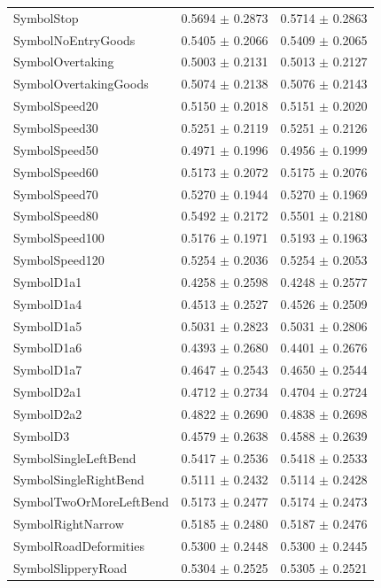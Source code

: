 \begin{longtable}{@{}lrr@{}}
SymbolStop & 0.5694 $\pm$ 0.2873 & 0.5714 $\pm$ 0.2863 \\
SymbolNoEntryGoods & 0.5405 $\pm$ 0.2066 & 0.5409 $\pm$ 0.2065 \\
SymbolOvertaking & 0.5003 $\pm$ 0.2131 & 0.5013 $\pm$ 0.2127 \\
SymbolOvertakingGoods & 0.5074 $\pm$ 0.2138 & 0.5076 $\pm$ 0.2143 \\
SymbolSpeed20 & 0.5150 $\pm$ 0.2018 & 0.5151 $\pm$ 0.2020 \\
SymbolSpeed30 & 0.5251 $\pm$ 0.2119 & 0.5251 $\pm$ 0.2126 \\
SymbolSpeed50 & 0.4971 $\pm$ 0.1996 & 0.4956 $\pm$ 0.1999 \\
SymbolSpeed60 & 0.5173 $\pm$ 0.2072 & 0.5175 $\pm$ 0.2076 \\
SymbolSpeed70 & 0.5270 $\pm$ 0.1944 & 0.5270 $\pm$ 0.1969 \\
SymbolSpeed80 & 0.5492 $\pm$ 0.2172 & 0.5501 $\pm$ 0.2180 \\
SymbolSpeed100 & 0.5176 $\pm$ 0.1971 & 0.5193 $\pm$ 0.1963 \\
SymbolSpeed120 & 0.5254 $\pm$ 0.2036 & 0.5254 $\pm$ 0.2053 \\
SymbolD1a1 & 0.4258 $\pm$ 0.2598 & 0.4248 $\pm$ 0.2577 \\
SymbolD1a4 & 0.4513 $\pm$ 0.2527 & 0.4526 $\pm$ 0.2509 \\
SymbolD1a5 & 0.5031 $\pm$ 0.2823 & 0.5031 $\pm$ 0.2806 \\
SymbolD1a6 & 0.4393 $\pm$ 0.2680 & 0.4401 $\pm$ 0.2676 \\
SymbolD1a7 & 0.4647 $\pm$ 0.2543 & 0.4650 $\pm$ 0.2544 \\
SymbolD2a1 & 0.4712 $\pm$ 0.2734 & 0.4704 $\pm$ 0.2724 \\
SymbolD2a2 & 0.4822 $\pm$ 0.2690 & 0.4838 $\pm$ 0.2698 \\
SymbolD3 & 0.4579 $\pm$ 0.2638 & 0.4588 $\pm$ 0.2639 \\
SymbolSingleLeftBend & 0.5417 $\pm$ 0.2536 & 0.5418 $\pm$ 0.2533 \\
SymbolSingleRightBend & 0.5111 $\pm$ 0.2432 & 0.5114 $\pm$ 0.2428 \\
SymbolTwoOrMoreLeftBend & 0.5173 $\pm$ 0.2477 & 0.5174 $\pm$ 0.2473 \\
SymbolRightNarrow & 0.5185 $\pm$ 0.2480 & 0.5187 $\pm$ 0.2476 \\
SymbolRoadDeformities & 0.5300 $\pm$ 0.2448 & 0.5300 $\pm$ 0.2445 \\
SymbolSlipperyRoad & 0.5304 $\pm$ 0.2525 & 0.5305 $\pm$ 0.2521 \\

\end{longtable}
